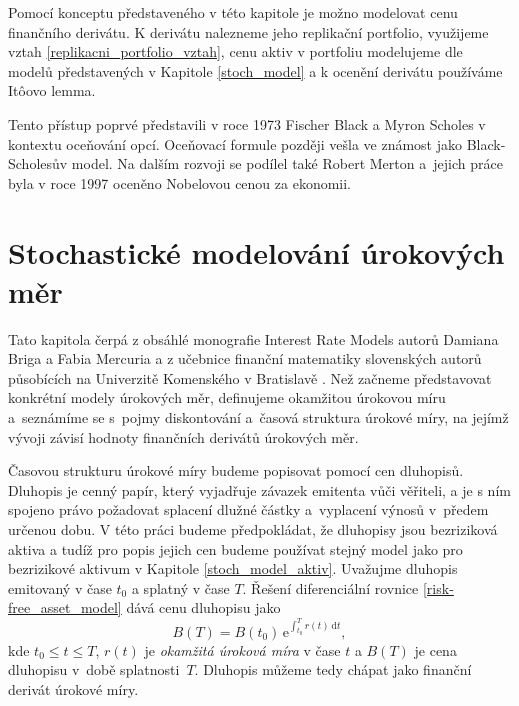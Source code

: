 \documentclass[a4paper,12pt]{report}
\theoremstyle{definition} \newtheorem{definice}[veta]{Definice}
\theoremstyle{remark}
\begin{document}
Pomocí konceptu představeného v této kapitole je možno modelovat cenu finančního derivátu.
K derivátu nalezneme jeho replikační portfolio, využijeme vztah \eqref{replikacni_portfolio_vztah}, cenu aktiv v portfoliu modelujeme dle modelů představených v Kapitole \ref{stoch_model} a k ocenění derivátu používáme It\^oovo lemma. 

Tento přístup poprvé představili v roce 1973 Fischer Black a Myron Scholes \cite{black1973pricing} v kontextu oceňování opcí. 
Oceňovací formule později vešla ve známost jako Black-Scholesův model.
Na dalším rozvoji se podílel také Robert Merton a~jejich práce byla v roce 1997 oceněno Nobelovou cenou za ekonomii.
 

\section{Stochastické modelování úrokových měr}\label{model_urok_miry_kap}
Tato kapitola čerpá z obsáhlé monografie Interest Rate Models autorů Damiana Briga a Fabia Mercuria \cite{brigo2007interest} a z učebnice finanční matematiky slovenských autorů působících na Univerzitě Komenského v Bratislavě \cite{melichercik}.
Než začneme představovat konkrétní modely úrokových měr, definujeme okamžitou úrokovou míru a~seznámíme se s~pojmy diskontování a~časová struktura úrokové míry, na jejímž vývoji závisí hodnoty finančních derivátů úrokových měr.

Časovou strukturu úrokové míry budeme popisovat pomocí cen dluhopisů.
Dluhopis je cenný papír, který vyjadřuje závazek emitenta vůči věřiteli, a je s ním spojeno právo požadovat splacení dlužné částky a~vyplacení výnosů v~předem určenou dobu.
V této práci budeme předpokládat, že dluhopisy jsou bezriziková aktiva a tudíž pro popis jejich cen budeme používat stejný model jako pro bezrizikové aktivum v Kapitole \ref{stoch_model_aktiv}.
Uvažujme dluhopis emitovaný v čase $t_0$ a splatný v čase $T$.
Řešení diferenciální rovnice \eqref{risk-free_asset_model} dává cenu dluhopisu jako
\begin{equation}\label{risk-free_asset_reseni}
B(T)=B(t_0)\,\mathrm{e}^{\int_{t_0}^T r(t)\,\mathrm{d}t},
\end{equation}
kde $t_0\leq t\leq T$,
$r(t)$ je \textit{okamžitá úroková míra} v čase $t$ a $B(T)$ je cena dluhopisu v~době splatnosti~$T$.
Dluhopis můžeme tedy chápat jako finanční derivát úrokové míry.
\end{document}
